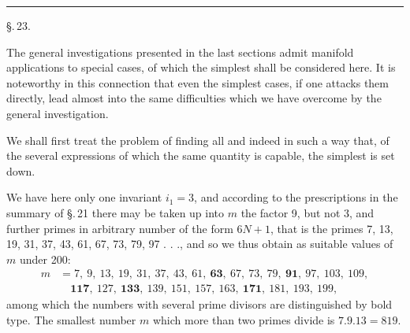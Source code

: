 \begin{center}
\end{center}

\begin{center}
\end{center}

\begin{center}
\rule{3cm}{0.4pt}
\end{center}

\begin{center}
\S.\,23.
\end{center}

\begin{center}
\end{center}

The general investigations presented in the last sections admit manifold applications to special cases, of which the simplest shall be considered here. It is noteworthy in this connection that even the simplest cases, if one attacks them directly, lead almost into the same difficulties which we have overcome by the general investigation.

We shall first treat the problem of finding all  and indeed in such a way that, of the several expressions of which the same quantity is capable, the simplest is set down.

We have here only one invariant $i_1=3$, and according to the prescriptions in the summary of \S.\,21 there may be taken up into $m$ the factor 9, but not 3, and further primes in arbitrary number of the form $6N+1$, that is the primes 7, 13, 19, 31, 37, 43, 61, 67, 73, 79, 97 . . ., and so we thus obtain as suitable values of $m$ under 200:
\[
\begin{aligned}
m &= 7,\ 9,\ 13,\ 19,\ 31,\ 37,\ 43,\ 61,\ \mathbf{63},\ 67,\ 73,\ 79,\ \mathbf{91},\ 97,\ 103,\ 109,\\
&\quad \mathbf{117},\ 127,\ \mathbf{133},\ 139,\ 151,\ 157,\ 163,\ \mathbf{171},\ 181,\ 193,\ 199,
\end{aligned}
\]
among which the numbers with several prime divisors are distinguished by bold type. The smallest number $m$ which more than two primes divide is $7.9.13=819$.
